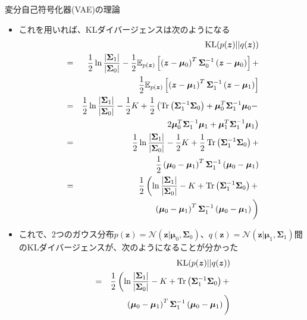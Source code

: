 \documentclass[dvipdfmx,notheorems,t]{beamer}
\begin{document}
\begin{frame}{変分自己符号化器(VAE)の理論}
\begin{itemize}
\begin{itemize}
		\item これを用いれば、KLダイバージェンスは次のようになる
		\begin{eqnarray}
			&& \operatorname{KL}(p(\bm{z}) || q(\bm{z})) \nonumber \\
			&=& \frac{1}{2} \ln \frac{|\bm{\Sigma}_1|}{|\bm{\Sigma}_0|} - \frac{1}{2} \mathbb{E}_{p(\bm{z})} \left[ \left( \bm{z} - \bm{\mu}_0 \right)^T \bm{\Sigma}_0^{-1} \left( \bm{z} - \bm{\mu}_0 \right) \right] + \nonumber \\
			&& \qquad \frac{1}{2} \mathbb{E}_{p(\bm{z})} \left[ \left( \bm{z} - \bm{\mu}_1 \right)^T \bm{\Sigma}_1^{-1} \left( \bm{z} - \bm{\mu}_1 \right) \right] \nonumber \\
			&=& \frac{1}{2} \ln \frac{|\bm{\Sigma}_1|}{|\bm{\Sigma}_0|} - \frac{1}{2} K + \frac{1}{2} \left( \operatorname{Tr} \left( \bm{\Sigma}_1^{-1} \bm{\Sigma}_0 \right) + \bm{\mu}_0^T \bm{\Sigma}_1^{-1} \bm{\mu}_0 - \right. \nonumber \\
			&& \qquad \left. 2 \bm{\mu}_0^T \bm{\Sigma}_1^{-1} \bm{\mu}_1 + \bm{\mu}_1^T \bm{\Sigma}_1^{-1} \bm{\mu}_1 \right) \nonumber \\
			&=& \frac{1}{2} \ln \frac{|\bm{\Sigma}_1|}{|\bm{\Sigma}_0|} - \frac{1}{2} K + \frac{1}{2} \operatorname{Tr} \left( \bm{\Sigma}_1^{-1} \bm{\Sigma}_0 \right) + \nonumber \\
			&& \qquad \frac{1}{2} \left( \bm{\mu}_0 - \bm{\mu}_1 \right)^T \bm{\Sigma}_1^{-1} \left( \bm{\mu}_0 - \bm{\mu}_1 \right) \nonumber \\
			&=& \frac{1}{2} \left( \ln \frac{|\bm{\Sigma}_1|}{|\bm{\Sigma}_0|} - K + \operatorname{Tr} \left( \bm{\Sigma}_1^{-1} \bm{\Sigma}_0 \right) + \right. \nonumber \\
			&& \qquad \left( \bm{\mu}_0 - \bm{\mu}_1 \right)^T \bm{\Sigma}_1^{-1} \left( \bm{\mu}_0 - \bm{\mu}_1 \right) \bigg)
		\end{eqnarray}
		
		\item これで、2つのガウス分布$p(\bm{z}) = \mathcal{N}(\bm{z} | \bm{\mu}_0, \bm{\Sigma}_0)$、$q(\bm{z}) = \mathcal{N}(\bm{z} | \bm{\mu}_1, \bm{\Sigma}_1)$間のKLダイバージェンスが、次のようになることが分かった
		\begin{eqnarray}
			&& \operatorname{KL}(p(\bm{z}) || q(\bm{z})) \nonumber \\
			&=& \frac{1}{2} \left( \ln \frac{|\bm{\Sigma}_1|}{|\bm{\Sigma}_0|} - K + \operatorname{Tr} \left( \bm{\Sigma}_1^{-1} \bm{\Sigma}_0 \right) + \right. \nonumber \\
			&& \qquad \left( \bm{\mu}_0 - \bm{\mu}_1 \right)^T \bm{\Sigma}_1^{-1} \left( \bm{\mu}_0 - \bm{\mu}_1 \right) \bigg)
		\end{eqnarray}
		

\end{itemize}
\end{itemize}
\end{frame}
\end{document}
